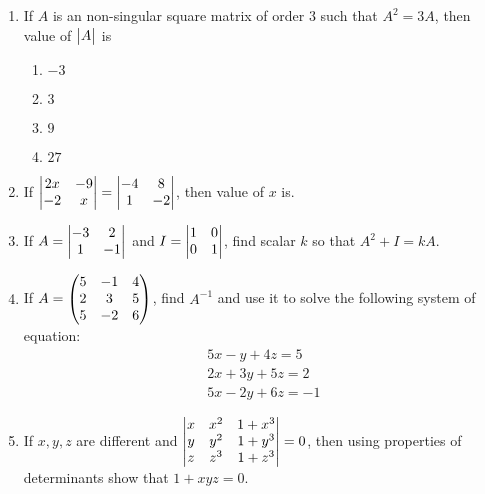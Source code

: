 \begin{enumerate}
\item If $A$ is an non-singular square matrix  of order $3$ such that $A^2=3A$, then value of $\begin{vmatrix}A\end{vmatrix}$ is\\
\begin{enumerate}[label=(\alph*)]
\item $-3$
\item $3$
\item $9$
\item $27$
\end{enumerate}
\item If $\begin{vmatrix}2x&-9\\ -2&x\end{vmatrix}=\begin{vmatrix}-4&8\\ 1&-2\end{vmatrix}$, then value of $x$ is. 	
\item If $A=\begin{vmatrix}-3&2\\ 1&-1\end{vmatrix}$ and $I=\begin{vmatrix}1&0\\ 0&1\end{vmatrix}$, find scalar $k$ so that $A^2+I=kA$.
\item If $A= \begin{pmatrix}5&-1&4\\ 2&3&5\\ 5&-2&6\end{pmatrix}$, find $A^{-1}$ and use it to solve the following system of equation: 
		\begin{align}
			5x-y+4z=5\\
			2x+3y+5z=2\\
			5x-2y+6z=-1
		\end{align}
\item If $x,y,z$ are different and $\begin{vmatrix}x&x^{2}&1+x^{3}\\ y&y^{2}&1+y^{3}\\ z&z^{3}&1+z^{3}\end{vmatrix}=0$, then using properties of determinants show that $1+xyz=0$.
\end{enumerate}

